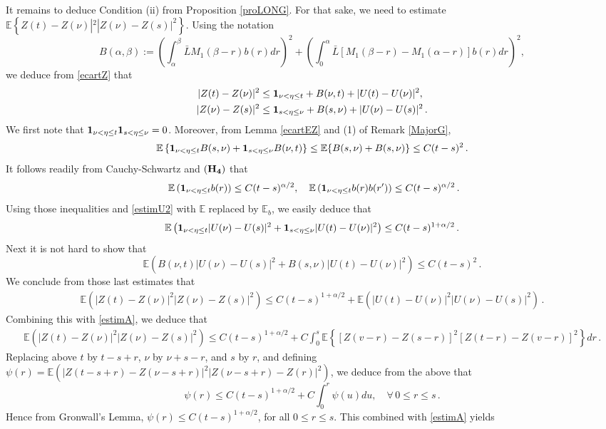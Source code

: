 \documentclass[11pt]{article}
\def\E{{\mathbb E}}
\begin{document}
It remains to deduce Condition (ii) from Proposition \ref{proLONG}. 
For that sake, we need to estimate\\ $\E\left\{Z(t)-Z(\nu)|^2|Z(\nu)-Z(s)|^2\right\}$. Using the notation
\[ B(\alpha,\beta):=\left(\int_\alpha^\beta \bar{L}M_1(\beta-r)b(r)dr\right)^2+\left(\int_0^\alpha \bar{L}[M_1(\beta-r)-M_1(\alpha-r)]b(r)dr\right)^2,\]
we deduce from \eqref{ecartZ} that
\begin{align*}
|Z(t)-Z(\nu)|^2&\le{\bf1}_{\nu<\eta\le t}+B(\nu,t)+|U(t)-U(\nu)|^2,\\
|Z(\nu)-Z(s)|^2&\le {\bf1}_{s<\eta\le \nu}+B(s,\nu)+|U(\nu)-U(s)|^2\,.
\end{align*}
We first note that ${\bf1}_{\nu<\eta\le t}{\bf1}_{s<\eta\le \nu}=0$. Moreover, from Lemma \ref{ecartEZ} and (1) of Remark \ref{MajorG},
\begin{align*}
\E\left\{{\bf1}_{\nu<\eta\le t}B(s,\nu)+{\bf1}_{s<\eta\le \nu}B(\nu,t)\right\}\le \E\{B(s,\nu)+B(s,\nu)\}\le C(t-s)^2\,.
\end{align*}
It follows readily from Cauchy-Schwartz and ${(\bf H_4)}$ that
\[ \E\left({\bf1}_{\nu<\eta\le t}b(r)\right)\le C(t-s)^{\alpha/2},\quad \E\left({\bf1}_{\nu<\eta\le t}b(r)b(r')\right)\le C(t-s)^{\alpha/2}\,.\]
Using those inequalities and \eqref{estimU2} with $\E$ replaced by $\E_b$, we easily deduce that
\begin{align*}
\E\left({\bf1}_{\nu<\eta\le t}|U(\nu)-U(s)|^2+{\bf1}_{s<\eta\le \nu}|U(t)-U(\nu)|^2\right)\le C(t-s)^{1+\alpha/2}\,.
\end{align*}
Next it is not hard to show that
\[ \E\left(B(\nu,t)|U(\nu)-U(s)|^2+B(s,\nu)|U(t)-U(\nu)|^2\right)\le C(t-s)^2\,.\]
We conclude from those last estimates that
\begin{align*}
\E\left(|Z(t)-Z(\nu)|^2|Z(\nu)-Z(s)|^2\right)\le C(t-s)^{1+\alpha/2}+\E\left(|U(t)-U(\nu)|^2|U(\nu)-U(s)|^2\right)\,.
\end{align*}
Combining this with \eqref{estimA}, we deduce that
\begin{align*}
\E\left(|Z(t)-Z(\nu)|^2|Z(\nu)-Z(s)|^2\right)\le C(t-s)^{1+\alpha/2}+C \int_0^s \E\left\{[Z(v-r)-Z(s-r)]^2[Z(t-r)-Z(v-r)]^2\right\}dr\,.
\end{align*}
Replacing above $t$ by $t-s+r$, $\nu$ by $\nu+s-r$, and $s$ by $r$, and defining\\
$\psi(r)= \E\left(|Z(t-s+r)-Z(\nu-s+r)|^2|Z(\nu-s+r)-Z(r)|^2\right)$, we deduce from the above that
\[ \psi(r)\le C(t-s)^{1+\alpha/2}+C\int_0^r\psi(u)du,\quad \forall\, 0\le r\le s\,.\]
Hence from Gronwall's Lemma, $\psi(r)\le C(t-s)^{1+\alpha/2}$, for all $0\le r\le s$. This combined with \eqref{estimA} yields
\end{document}
